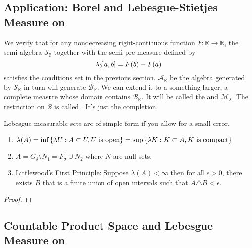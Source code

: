 \subsection{Application: Borel and Lebesgue-Stietjes Measure on }

We verify that for any nondecreasing right-continuous function \(F: \mathbb{R}\to \mathbb{R}\), the semi-algebra \(\mathcal{S}_{\mathbb{R}}\) together with the semi-pre-measure defined by 
\begin{equation*}
    \lambda_{0} \linterval{a}{b} = F(b) - F(a)
\end{equation*}
satisfies the conditions set in the previous section. \(\mathcal{A}_{\mathbb{R}}\) be the algebra generated by \(\mathcal{S}_{\mathbb{R}}\) in turn will generate \(\mathcal{B}_{\mathbb{R}}\). We can extend it to a something larger, a complete measure whose domain contains \(\mathcal{B}_{\mathbb{R}}\). It will be called the  and  \(\mathcal{M}_{\lambda}\). The restriction on \(\mathcal{B}\) is called . It's just the completion.  

\begin{thm}
    Lebesgue measurable sets are of simple form if you allow for a small error.

    \begin{enumerate}
        \item \(\lambda(A) = \inf\Bqty{\lambda U:  A \subset U, U  \text{ is open}} = \sup\Bqty{\lambda K : K \subset A, K \text{ is compact}}\)
        \item \(A = G_{\delta} \setminus N_{1}= F_{\sigma} \cup N_{2}\) where \(N\) are null sets.  
        \item Littlewood's First Principle: Suppose \(\lambda(A) < \infty\) then for all \(\epsilon > 0\), there exists \(B\) that is a finite union of open intervals such that \(A \triangle B < \epsilon\). 
    \end{enumerate}
\end{thm}
\begin{proof}
    
\end{proof}

\subsection{Countable Product Space and Lebesgue Measure on }

